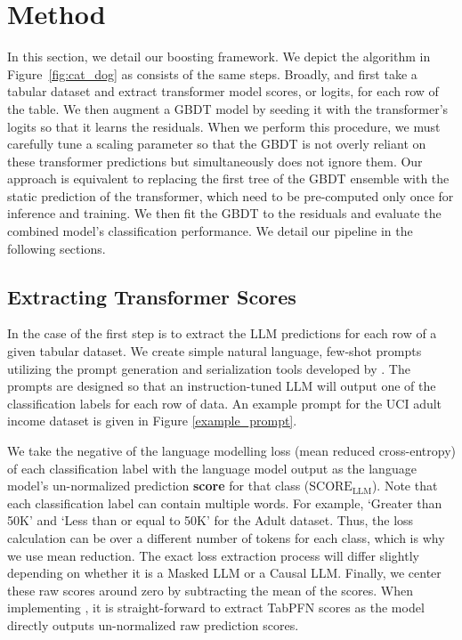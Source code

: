 \section{Method}
\label{method}

In this section, we detail our boosting framework. We depict the \methodname algorithm in Figure~\ref{fig:cat_dog} as \methodnamepfn consists of the same steps. Broadly, \methodname and \methodnamepfn first take a tabular dataset and extract transformer model scores, or logits, for each row of the table. We then augment a GBDT model by seeding it with the transformer's logits so that it learns the residuals. When we perform this procedure, we must carefully tune a scaling parameter so that the GBDT is not overly reliant on these transformer predictions but simultaneously does not ignore them. Our approach is equivalent to replacing the first tree of the GBDT ensemble with the static prediction of the transformer, which need to be pre-computed only once for inference and training.
We then fit the GBDT to the residuals and evaluate the combined model's classification performance. We detail our pipeline in the following sections.

\subsection{Extracting Transformer Scores}
\label{score_extract}
In the case of \methodname the first step is to extract the LLM predictions for each row of a given tabular dataset. We create simple natural language, few-shot prompts utilizing the prompt generation and serialization tools developed by \citet{tabletSlack23}. The prompts are designed so that an instruction-tuned LLM will output one of the classification labels for each row of data. An example prompt for the UCI adult income dataset is given in Figure \ref{example_prompt}.

We take the negative of the language modelling loss (mean reduced cross-entropy) of each classification label with the language model output as the language model's un-normalized prediction \textbf{score} for that class ($\text{SCORE}_{\text{LLM}}$). Note that each classification label can contain multiple words. For example, `Greater than 50K' and `Less than or equal to 50K' for the Adult dataset. Thus, the loss calculation can be over a different number of tokens for each class, which is why we use mean reduction. The exact loss extraction process will differ slightly depending on whether it is a Masked LLM or a Causal LLM. Finally, we center these raw scores around zero by subtracting the mean of the scores.  When implementing \methodnamepfn, it is straight-forward to extract TabPFN scores as the model directly outputs un-normalized raw prediction scores.


